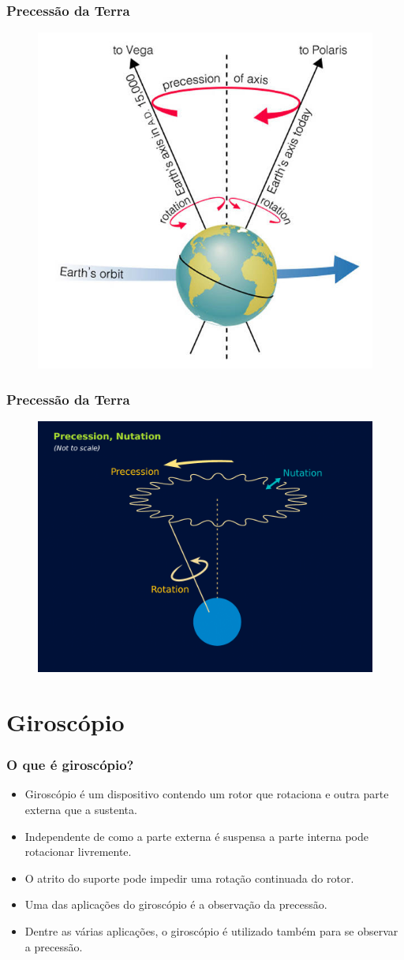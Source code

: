 \documentclass{beamer}
\begin{document}
\begin{frame}
\frametitle{Precessão da Terra}
\begin{figure}
\includegraphics[width=2.2 in]{figuras/earthprecess.jpg}
\end{figure}
\end{frame}






\begin{frame}
\frametitle{Precessão da Terra}
\begin{figure}
\includegraphics[width=3.7 in]{figuras/Precession_Nutation.png}
\end{figure}
\end{frame}


\section{Giroscópio}


\begin{frame}
\frametitle{O que é giroscópio?}
\begin{itemize}
\item Giroscópio é um dispositivo contendo um rotor que rotaciona e outra parte externa que a sustenta. 
\item Independente de como a parte externa é suspensa a parte interna pode rotacionar livremente.
\item O atrito do suporte pode impedir uma rotação continuada do rotor.
\item Uma das aplicações do giroscópio é a observação da precessão.
\item Dentre as várias aplicações, o giroscópio é utilizado também para se observar a precessão.
\end{itemize}
\end{frame}
\end{document}
